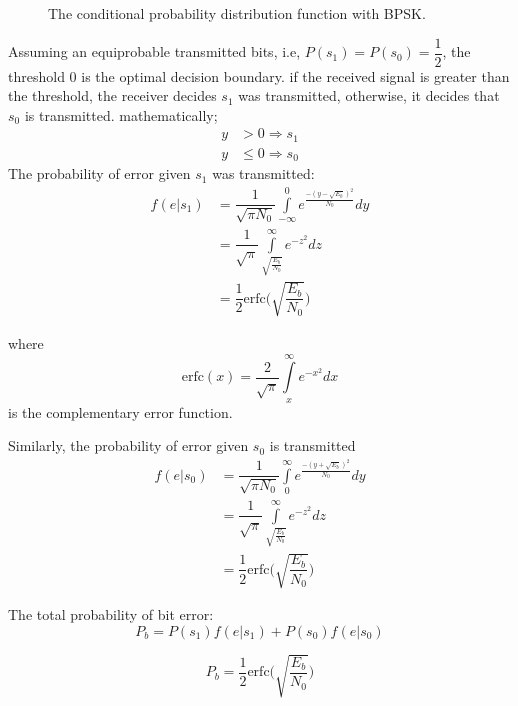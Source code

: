 	\begin{figure}[htb]
	\captionsetup{list=no}
	\centering
	\def\svgwidth{\textwidth} %
	
	\caption{The conditional probability distribution function with BPSK.}
	\label{figI:BPSK_BER}
	\end{figure}
	
Assuming an equiprobable transmitted bits, i.e, $ P(s_1)=P(s_0)=\dfrac{1}{2} $, the threshold $ 0 $ is the optimal decision boundary.
if the received signal is greater than the threshold, the receiver decides $ s_1 $ was transmitted, otherwise, it decides that $ s_0 $ is transmitted. mathematically;
\begin{align*}
y&>0 \Rightarrow s_1\\
y&\leq 0 \Rightarrow s_0
\end{align*}
The probability of error given $ s_1 $ was transmitted:
\begin{align}
f(e|s_1)&=\dfrac{1}{\sqrt{\pi N_0}}\int\limits_{-\infty}^{0}e^{\frac{{-(y-\sqrt{E_b})}^2}{N_0}}dy\\
&=\dfrac{1}{\sqrt{\pi}}\int\limits_{\sqrt{\frac{E_b}{N_0}}}^{\infty}e^{-z^2}dz\\
&=\dfrac{1}{2}\text{erfc}\Big( \sqrt{\dfrac{E_b}{N_0}} \Big)
\end{align}

where
 \begin{equation}
\text{erfc}(x)=\dfrac{2}{\sqrt{\pi}}\int\limits_{x}^{\infty}e^{-x^2}dx
\end{equation}
is the complementary error function.

Similarly, the probability of error given $ s_0 $ is transmitted
\begin{align}
f(e|s_0)&=\dfrac{1}{\sqrt{\pi N_0}}\int\limits_{0}^{\infty}e^{\frac{{-(y+\sqrt{E_b})}^2}{N_0}}dy\\
&=\dfrac{1}{\sqrt{\pi}}\int\limits_{\sqrt{\frac{E_b}{N_0}}}^{\infty}e^{-z^2}dz\\
&=\dfrac{1}{2}\text{erfc}\Big( \sqrt{\dfrac{E_b}{N_0}} \Big)
\end{align}

The total probability of bit error:
\begin{equation}
P_b=P(s_1)f(e|s_1)+P(s_0)f(e|s_0)
\end{equation}

\begin{equation}
P_b=\dfrac{1}{2}\text{erfc}\Big( \sqrt{\dfrac{E_b}{N_0}} \Big)
\end{equation}
\clearpage